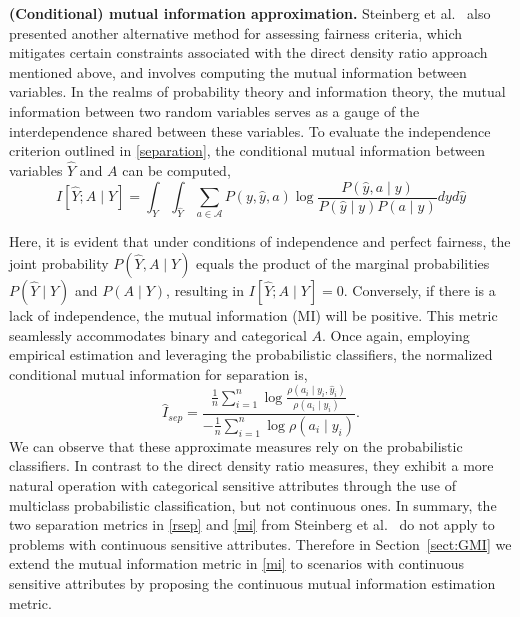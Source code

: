 \textbf{(Conditional) mutual information approximation.} 
Steinberg et al.~\cite{steinberg2020fairness} also presented another alternative method for assessing fairness criteria, which mitigates certain constraints associated with the direct density ratio approach mentioned above, and involves computing the mutual information \cite{cover1991elements} between variables. In the realms of probability theory and information theory, the mutual information between two random variables serves as a gauge of the interdependence shared between these variables. To evaluate the independence criterion outlined in \eqref{separation}, the conditional mutual information between variables $\hat{Y}$ and $A$ can be computed,
\begin{equation}
    I[\hat{Y};A \mid Y] = \int_{Y} \int_{\hat{Y}} \sum_{a \in \mathcal{A}} P(y,\hat{y},a) \log \frac{P(\hat{y},a \mid y)}{P(\hat{y}\mid y)P(a\mid y) } dyd\hat{y}
\end{equation}

Here, it is evident that under conditions of independence and perfect fairness, the joint probability $P(\hat{Y}, A \mid Y)$ equals the product of the marginal probabilities $P(\hat{Y} \mid Y)$ and $P(A \mid Y)$, resulting in $I[\hat{Y};A \mid Y] = 0$. Conversely, if there is a lack of independence, the mutual information (MI) will be positive. This metric seamlessly accommodates binary and categorical $A$. Once again, employing empirical estimation and leveraging the probabilistic classifiers, the normalized conditional mutual information for separation is,
\begin{equation}\label{mi}
\hat{I}_{sep} =
\frac{
\frac{1}{n} \sum_{i=1}^n \log \frac{\rho(a_i\mid y_i, \hat{y}_i)}{\rho(a_i \mid y_i)}
}{
-\frac{1}{n} \sum_{i=1}^n \log \rho(a_i \mid y_i)
}.
\end{equation}
We can observe that these approximate measures rely on the probabilistic classifiers. In contrast to the direct density ratio measures, they exhibit a more natural operation with categorical sensitive attributes through the use of multiclass probabilistic classification, but not continuous ones.
In summary, the two separation metrics in \eqref{rsep} and \eqref{mi} from Steinberg et al.~\cite{steinberg2020fairness} do not apply to problems with continuous sensitive attributes. Therefore in Section~\ref{sect:GMI} we extend the mutual information metric in \eqref{mi} to scenarios with continuous sensitive attributes by proposing the continuous mutual information estimation metric.

